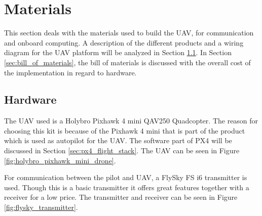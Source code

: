 \documentclass[../Head/report.tex]{subfiles}
\begin{document}


\lstset{style=mystyle}

\section{Materials}
This section deals with the materials used to build the UAV, for communication and onboard computing. A description of the different products and a wiring diagram for the UAV platform will be analyzed in Section \ref{sec:hardware}. In Section \ref{sec:bill_of_materials}, the bill of materials is discussed with the overall cost of the implementation in regard to hardware.   

\subsection{Hardware}
\label{sec:hardware}

The UAV used is a Holybro Pixhawk 4 mini QAV250 Quadcopter. The reason for choosing this kit is because of the Pixhawk 4 mini that is part of the product which is used as autopilot for the UAV. The software part of PX4 will be discussed in Section \ref{sec:px4_flight_stack}. The UAV can be seen in Figure \ref{fig:holybro_pixhawk_mini_drone}. 

For communication between the pilot and UAV, a FlySky FS i6 transmitter is used. Though this is a basic transmitter it offers great features together with a receiver for a low price. The transmitter and receiver can be seen in Figure \ref{fig:flysky_transmitter}. 
\end{document}
